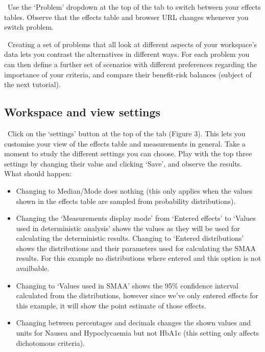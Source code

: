 \documentclass[00_mcda_tutorial.tex]{subfiles}
\begin{document}
\noindent \leftpointright \, Use the ‘Problem’ dropdown at the top of the tab to switch between your effects tables. Observe that the effects table and browser URL changes whenever you switch problem.
\newline

\noindent \faGraduationCap \, Creating a set of problems that all look at different aspects of your workspace’s data lets you contrast the alternatives in different ways. For each problem you can then define a further set of scenarios with different preferences regarding the importance of your criteria, and compare their benefit-risk balances (subject of the next tutorial).

\subsection*{Workspace and view settings}

\noindent \leftpointright \, Click on the ‘settings’ button at the top of the tab (Figure 3). This lets you customise your view of the effects table and measurements in general. Take a moment to study the different settings you can choose. Play with the top three settings by changing their value and clicking ‘Save’, and observe the results. What should happen:

\begin{itemize}
\item Changing to Median/Mode does nothing (this only applies when the values shown in the effects table are sampled from probability distributions).
\item Changing the ‘Measurements display mode’ from ‘Entered effects’ to ‘Values used in deterministic analysis’ shows the values as they will be used for calculating the deterministic results. 
Changing to ‘Entered distributions’ shows the distributions and their parameters used for calculating the SMAA results. For this example no distributions where entered and this option is not availbable.
\item Changing to ‘Values used in SMAA’ shows the 95\% confidence interval calculated from the distributions, however since we’ve only entered effects for this example, it will show the point estimate of those effects.
\item Changing between percentages and decimals changes the shown values and units for Nausea and Hypoclycaemia but not HbA1c (this setting only affects dichotomous criteria).
\end{itemize}
\end{document}

